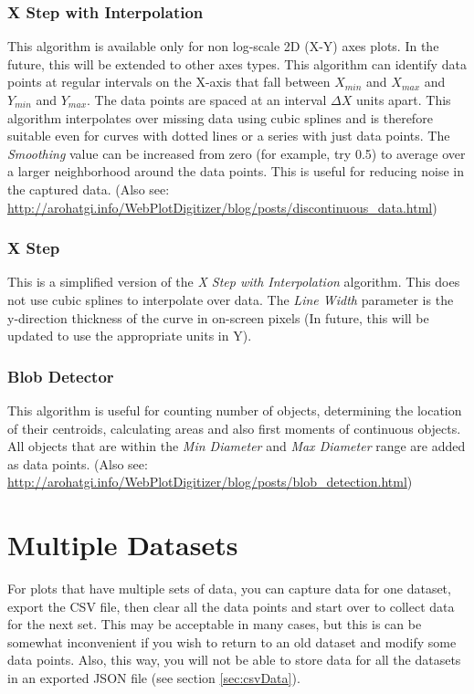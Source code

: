 \documentclass[letterpaper, 10pt]{article}
\begin{document}
\subsubsection{X Step with Interpolation}
This algorithm is available only for non log-scale 2D (X-Y) axes plots. In the future, this will be extended to other axes types. This algorithm can identify data points at regular intervals on the X-axis that fall between $X_{min}$ and $X_{max}$ and $Y_{min}$ and $Y_{max}$. The data points are spaced at an interval $\Delta X$ units apart. This algorithm interpolates over missing data using cubic splines and is therefore suitable even for curves with dotted lines or a series with just data points. The \emph{Smoothing} value can be increased from zero (for example, try 0.5) to average over a larger neighborhood around the data points. This is useful for reducing noise in the captured data. (Also see: \url{http://arohatgi.info/WebPlotDigitizer/blog/posts/discontinuous_data.html})

\subsubsection{X Step}
This is a simplified version of the \emph{X Step with Interpolation} algorithm. This does not use cubic splines to interpolate over data. The \emph{Line Width} parameter is the y-direction thickness of the curve in on-screen pixels (In future, this will be updated to use the appropriate units in Y). 

\subsubsection{Blob Detector}
This algorithm is useful for counting number of objects, determining the location of their centroids, calculating areas and also first moments of continuous objects. All objects that are within the \emph{Min Diameter} and \emph{Max Diameter} range are added as data points. (Also see: \url{http://arohatgi.info/WebPlotDigitizer/blog/posts/blob_detection.html})

\section{Multiple Datasets}
\label{sec:multipleDatasets}
For plots that have multiple sets of data, you can capture data for one dataset, export the CSV file, then clear all the data points and start over to collect data for the next set. This may be acceptable in many cases, but this is can be somewhat inconvenient if you wish to return to an old dataset and modify some data points. Also, this way, you will not be able to store data for all the datasets in an exported JSON file (see section \ref{sec:csvData}). 
\end{document}
